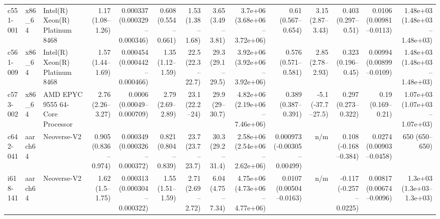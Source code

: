 \begin{tabular}{lllrrrrrrrrrrr}
c551-001 & x86\_64 & Intel(R) Xeon(R) Platinum 8468 & 1.17 (1.08–1.26) & 0.000337 (0.000329–0.000346) & 0.608 (0.554–0.661) & 1.53 (1.38–1.68) & 3.65 (3.49–3.81) & 3.7e+06 (3.68e+06–3.72e+06) & 0.61 (0.567–0.654) & 3.15 (2.87–3.43) & 0.403 (0.297–0.51) & 0.0106 (0.00981–0.0113) & 1.48e+03 (1.48e+03–1.48e+03) \\
c561-009 & x86\_64 & Intel(R) Xeon(R) Platinum 8468 & 1.57 (1.44–1.69) & 0.000454 (0.000442–0.000466) & 1.35 (1.12–1.59) & 22.5 (22.3–22.7) & 29.3 (29.1–29.5) & 3.92e+06 (3.92e+06–3.92e+06) & 0.576 (0.571–0.581) & 2.85 (2.78–2.93) & 0.323 (0.196–0.45) & 0.00994 (0.00899–0.0109) & 1.48e+03 (1.48e+03–1.48e+03) \\
c573-002 & x86\_64 & AMD EPYC 9555 64-Core Processor & 2.76 (2.26–3.27) & 0.0006 (0.00049–0.000709) & 2.79 (2.69–2.89) & 23.1 (22.2–24) & 29.9 (29–30.7) & 4.82e+06 (2.19e+06–7.46e+06) & 0.389 (0.387–0.391) & -5.1 (-37.7–27.5) & 0.297 (0.273–0.322) & 0.19 (0.169–0.21) & 1.07e+03 (1.07e+03–1.07e+03) \\
c642-041 & aarch64 & Neoverse-V2 & 0.905 (0.836–0.974) & 0.000349 (0.000326–0.000372) & 0.821 (0.804–0.839) & 23.7 (23.7–23.7) & 30.3 (29.2–31.4) & 2.58e+06 (2.54e+06–2.62e+06) & 0.000973 (-0.00305–0.00499) & n/m & 0.108 (-0.168–0.384) & 0.0274 (0.00903–0.0458) & 650 (650–650) \\
i618-141 & aarch64 & Neoverse-V2 & 1.62 (1.5–1.75) & 0.000313 (0.000304–0.000322) & 1.55 (1.51–1.59) & 2.71 (2.69–2.72) & 6.04 (4.75–7.34) & 4.75e+06 (4.73e+06–4.77e+06) & 0.0107 (0.00504–0.0163) & n/m & -0.117 (-0.257–0.0225) & 0.00817 (0.00674–0.0096) & 1.3e+03 (1.3e+03–1.3e+03) \\
\bottomrule
\end{tabular}
